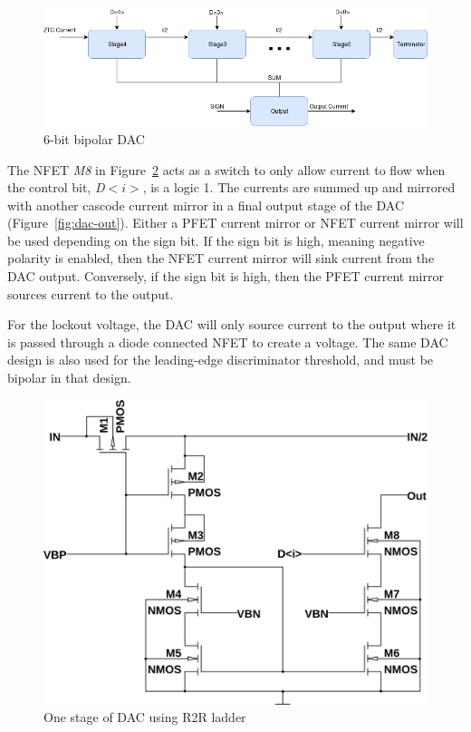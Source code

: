 \documentclass[12pt,oneside,final]{siuethesis}
\theoremstyle{definition}
\begin{document}
\begin{figure}[htbp!]
\centering
\includegraphics[scale=.55,keepaspectratio=true]{./ch3_figures/dac.png} 
\caption{6-bit bipolar DAC}
\label{fig:dac-block}
\end{figure}

\par The NFET \emph{M8} in Figure~\ref{fig:dac} acts as a switch to only allow current to flow when the control bit, \emph{D$<i>$}, is a logic 1. The currents are summed up and mirrored with another cascode current mirror in a final output stage of the DAC (Figure~\ref{fig:dac-out}). Either a PFET current mirror or NFET current mirror will be used depending on the sign bit. If the sign bit is high, meaning negative polarity is enabled, then the NFET current mirror will sink current from the DAC output. Conversely, if the sign bit is high, then the PFET current mirror sources current to the output.
\par For the lockout voltage, the DAC will only source current to the output where it is passed through a diode connected NFET to create a voltage. The same DAC design is also used for the leading-edge discriminator threshold, and must be bipolar in that design. 

\begin{figure}[htbp!]
\centering
\includegraphics[scale=.4,keepaspectratio=true]{../LTspice_Drawings/dac/dac_stage.png} 
\caption{One stage of DAC using R2R ladder}
\label{fig:dac}
\end{figure}
\end{document}
